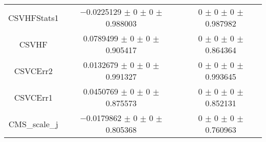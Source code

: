 \begin{table}
\begin{tabular}{ccc}
CSVHFStats1 	& \num{-0.0225129} $\pm$ \num{0} $\pm$ \num{0} $\pm$ \num{0.988003} 	& \num{0} $\pm$ \num{0} $\pm$ \num{0} $\pm$ \num{0.987982}\\
CSVHF 	& \num{0.0789499} $\pm$ \num{0} $\pm$ \num{0} $\pm$ \num{0.905417} 	& \num{0} $\pm$ \num{0} $\pm$ \num{0} $\pm$ \num{0.864364}\\
CSVCErr2 	& \num{0.0132679} $\pm$ \num{0} $\pm$ \num{0} $\pm$ \num{0.991327} 	& \num{0} $\pm$ \num{0} $\pm$ \num{0} $\pm$ \num{0.993645}\\
CSVCErr1 	& \num{0.0450769} $\pm$ \num{0} $\pm$ \num{0} $\pm$ \num{0.875573} 	& \num{0} $\pm$ \num{0} $\pm$ \num{0} $\pm$ \num{0.852131}\\
CMS\_scale\_j 	& \num{-0.0179862} $\pm$ \num{0} $\pm$ \num{0} $\pm$ \num{0.805368} 	& \num{0} $\pm$ \num{0} $\pm$ \num{0} $\pm$ \num{0.760963}\\
\bottomrule
\end{tabular}
\end{table}